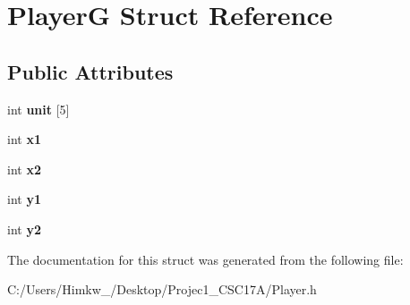 \hypertarget{struct_player_g}{\section{Player\+G Struct Reference}
\label{struct_player_g}
}
\subsection*{Public Attributes}
\begin{DoxyCompactItemize}
\item 
\hypertarget{struct_player_g_a4e512f09cc8862e62a94aef34b8db96b}{int {\bfseries unit} \mbox{[}5\mbox{]}}\label{struct_player_g_a4e512f09cc8862e62a94aef34b8db96b}

\item 
\hypertarget{struct_player_g_aff58effcc99993b732db61c6e03c58d0}{int {\bfseries x1}}\label{struct_player_g_aff58effcc99993b732db61c6e03c58d0}

\item 
\hypertarget{struct_player_g_ade2623d23a328953a51615492e913572}{int {\bfseries x2}}\label{struct_player_g_ade2623d23a328953a51615492e913572}

\item 
\hypertarget{struct_player_g_a6261644d313c41f1bf3d6db8b30fd3f0}{int {\bfseries y1}}\label{struct_player_g_a6261644d313c41f1bf3d6db8b30fd3f0}

\item 
\hypertarget{struct_player_g_a12d227b763690cf43b035655fc9cad90}{int {\bfseries y2}}\label{struct_player_g_a12d227b763690cf43b035655fc9cad90}

\end{DoxyCompactItemize}


The documentation for this struct was generated from the following file\+:\begin{DoxyCompactItemize}
\item 
C\+:/\+Users/\+Himkw\+\_/\+Desktop/\+Projec1\+\_\+\+C\+S\+C17\+A/Player.\+h\end{DoxyCompactItemize}
